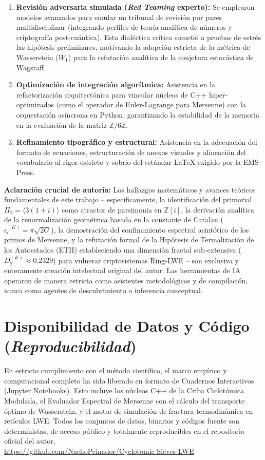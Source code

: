 \documentclass{article}
\numberwithin{equation}{section}
\theoremstyle{plain}
\theoremstyle{definition}
\begin{document}
\begin{enumerate}
    \item \textbf{Revisión adversaria simulada (\textit{Red Teaming} experto):} Se emplearon modelos avanzados para emular un tribunal de revisión por pares multidisciplinar (integrando perfiles de teoría analítica de números y criptografía post-cuántica). Esta dialéctica crítica sometió a pruebas de estrés las hipótesis preliminares, motivando la adopción estricta de la métrica de Wasserstein ($W_1$) para la refutación analítica de la conjetura estocástica de Wagstaff.
    \item \textbf{Optimización de integración algorítmica:} Asistencia en la refactorización arquitectónica para vincular núcleos de C++ hiper-optimizados (como el operador de Euler-Lagrange para Mersenne) con la orquestación asíncrona en Python, garantizando la estabilidad de la memoria en la evaluación de la matriz $\mathbb{Z}/6\mathbb{Z}$.
    \item \textbf{Refinamiento tipográfico y estructural:} Asistencia en la adecuación del formato de ecuaciones, estructuración de anexos visuales y alineación del vocabulario al rigor estricto y sobrio del estándar LaTeX exigido por la EMS Press.
\end{enumerate}

\textbf{Aclaración crucial de autoría:} Los hallazgos matemáticos y avances teóricos fundamentales de este trabajo -- específicamente, la identificación del primorial $\Pi_2 = \langle 3(1+i) \rangle$ como atractor de parsimonia en $\mathbb{Z}[i]$, la derivación analítica de la renormalización geométrica basada en la constante de Catalan ($\epsilon_c^{(K)} = \pi\sqrt{2G}$), la demostración del confinamiento espectral asintótico de los primos de Mersenne, y la refutación formal de la Hipótesis de Termalización de los Autoestados (ETH) estableciendo una dimensión fractal sub-extensiva ($D_2^{(K)} \approx 0.2329$) para vulnerar criptosistemas Ring-LWE -- son exclusiva y enteramente creación intelectual original del autor. Las herramientas de IA operaron de manera estricta como asistentes metodológicos y de compilación, nunca como agentes de descubrimiento o inferencia conceptual.

\section*{Disponibilidad de Datos y Código (\textit{Reproducibilidad})}
En estricto cumplimiento con el método científico, el marco empírico y computacional completo ha sido liberado en formato de Cuadernos Interactivos (Jupyter Notebooks). Esto incluye los núcleos C++ de la Criba Ciclotómica Modulada, el Evaluador Espectral de Mersenne con el cálculo del transporte óptimo de Wasserstein, y el motor de simulación de fractura termodinámica en retículos LWE. Todos los conjuntos de datos, binarios y códigos fuente son deterministas, de acceso público y totalmente reproducibles en el repositorio oficial del autor, \\
\url{https://github.com/NachoPeinador/Cyclotomic-Sieves-LWE}
\end{document}
